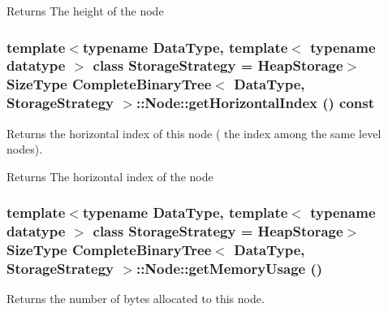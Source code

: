 \begin{DoxyReturn}{Returns}
The height of the node 
\end{DoxyReturn}
\hypertarget{class_complete_binary_tree_1_1_node_a36d28454d7336f2366b784335169a46c}{
\subsubsection[{getHorizontalIndex}]{\setlength{\rightskip}{0pt plus 5cm}template$<$typename DataType, template$<$ typename datatype $>$ class StorageStrategy = HeapStorage$>$ SizeType {\bf CompleteBinaryTree}$<$ DataType, StorageStrategy $>$::Node::getHorizontalIndex () const}}
\label{class_complete_binary_tree_1_1_node_a36d28454d7336f2366b784335169a46c}


Returns the horizontal index of this node ( the index among the same level nodes). 

\begin{DoxyReturn}{Returns}
The horizontal index of the node 
\end{DoxyReturn}
\hypertarget{class_complete_binary_tree_1_1_node_a3735cf9d8680a7aeb0f88cf4f7672921}{
\subsubsection[{getMemoryUsage}]{\setlength{\rightskip}{0pt plus 5cm}template$<$typename DataType, template$<$ typename datatype $>$ class StorageStrategy = HeapStorage$>$ SizeType {\bf CompleteBinaryTree}$<$ DataType, StorageStrategy $>$::Node::getMemoryUsage ()}}
\label{class_complete_binary_tree_1_1_node_a3735cf9d8680a7aeb0f88cf4f7672921}


Returns the number of bytes allocated to this node. 


